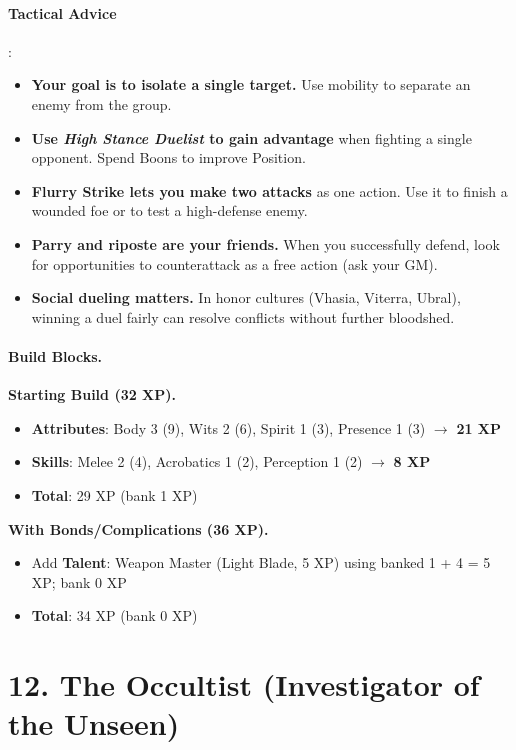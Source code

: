 \paragraph{Tactical Advice}:
\begin{itemize}
\item \textbf{Your goal is to isolate a single target.} Use mobility to separate an enemy from the group.
\item \textbf{Use \emph{High Stance Duelist} to gain advantage} when fighting a single opponent. Spend Boons to improve Position.
\item \textbf{Flurry Strike lets you make two attacks} as one action. Use it to finish a wounded foe or to test a high-defense enemy.
\item \textbf{Parry and riposte are your friends.} When you successfully defend, look for opportunities to counterattack as a free action (ask your GM).
\item \textbf{Social dueling matters.} In honor cultures (Vhasia, Viterra, Ubral), winning a duel fairly can resolve conflicts without further bloodshed.
\end{itemize}

\paragraph{Build Blocks.}
\textbf{Starting Build (32 XP).}
\begin{itemize}
\item \textbf{Attributes}: Body 3 (9), Wits 2 (6), Spirit 1 (3), Presence 1 (3) \(\rightarrow\) \textbf{21 XP}
\item \textbf{Skills}: Melee 2 (4), Acrobatics 1 (2), Perception 1 (2) \(\rightarrow\) \textbf{8 XP}
\item \textbf{Total}: 29 XP (bank 1 XP)
\end{itemize}
\textbf{With Bonds/Complications (36 XP).}
\begin{itemize}
\item Add \textbf{Talent}: Weapon Master (Light Blade, 5 XP) using banked 1 + 4 = 5 XP; bank 0 XP
\item \textbf{Total}: 34 XP (bank 0 XP)
\end{itemize}

\section{12. The Occultist (Investigator of the Unseen)}
\label{sec:concept-occultist}


